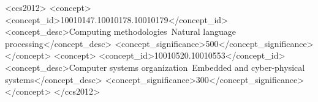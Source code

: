 \documentclass[acmsmall,screen,review]{acmart}
\begin{document}
\begin{CCSXML}
<ccs2012>
   <concept>
       <concept_id>10010147.10010178.10010179</concept_id>
       <concept_desc>Computing methodologies~Natural language processing</concept_desc>
       <concept_significance>500</concept_significance>
   </concept>
   <concept>
       <concept_id>10010520.10010553</concept_id>
       <concept_desc>Computer systems organization~Embedded and cyber-physical systems</concept_desc>
       <concept_significance>300</concept_significance>
   </concept>
</ccs2012>
\end{CCSXML}



\maketitle
\glsresetall






















\end{document}

